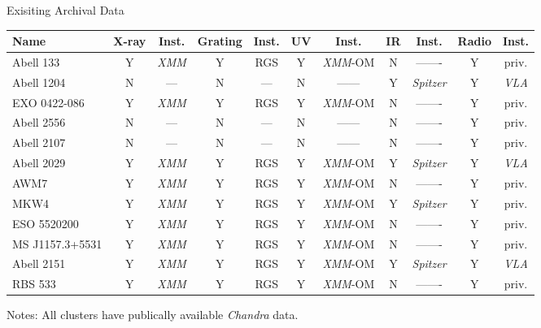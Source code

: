 \documentclass[11pt]{article}
\begin{document}
\begin{center}
Exisiting Archival Data
\small
\begin{tabular}{lcccccccccc}
\hline
Name & X-ray & Inst. & Grating & Inst. & UV & Inst. & IR & Inst. & Radio & Inst.\\
\hline
\hline
Abell 133       & Y & {\it XMM} & Y & RGS & Y & {\it XMM}-OM & N & ------- & Y & priv.\\
Abell 1204      & N & --- & N & --- & N & ------ & Y & {\it Spitzer} & Y & {\it VLA}\\
EXO 0422-086    & Y & {\it XMM} & Y & RGS & Y & {\it XMM}-OM & N & ------- & Y & priv.\\
Abell 2556      & N & --- & N & --- & N & ------ & N & ------- & Y & priv.\\
Abell 2107      & N & --- & N & --- & N & ------ & N & ------- & Y & priv.\\
Abell 2029      & Y & {\it XMM} & Y & RGS & Y & {\it XMM}-OM & Y & {\it Spitzer} & Y & {\it VLA}\\
AWM7            & Y & {\it XMM} & Y & RGS & Y & {\it XMM}-OM & N & ------- & Y & priv.\\
MKW4            & Y & {\it XMM} & Y & RGS & Y & {\it XMM}-OM & Y & {\it Spitzer} & Y & priv.\\
ESO 5520200     & Y & {\it XMM} & Y & RGS & Y & {\it XMM}-OM & N & ------- & Y & priv.\\
MS J1157.3+5531 & Y & {\it XMM} & Y & RGS & Y & {\it XMM}-OM & N & ------- & Y & priv.\\
Abell 2151      & Y & {\it XMM} & Y & RGS & Y & {\it XMM}-OM & Y & {\it Spitzer} & Y & {\it VLA}\\
RBS 533         & Y & {\it XMM} & Y & RGS & Y & {\it XMM}-OM & N & ------- & Y & priv.\\
\hline
\end{tabular}
\label{tab:observations}
\end{center}
\footnotesize
Notes: All clusters have publically available {\it Chandra} data.
\normalsize


\clearpage


 
\end{document}
